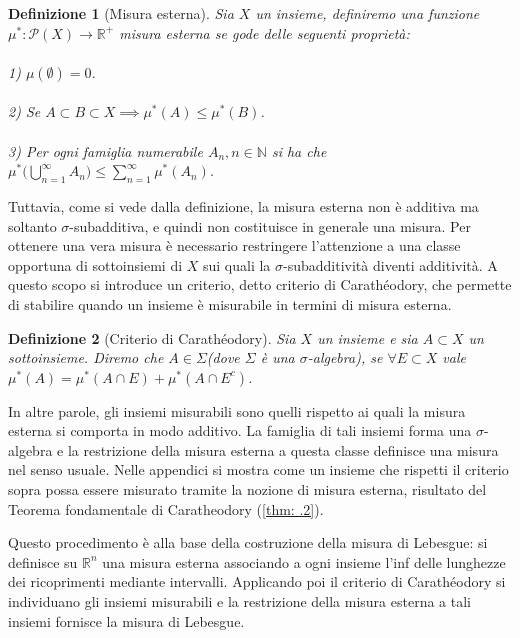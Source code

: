 \documentclass[a4paper,12pt]{report}
\newtheorem{definizione}{Definizione}[chapter]
\begin{document}
\begin{definizione}[Misura esterna]\label{def: 3.4}
    Sia $X$ un insieme, definiremo una funzione 
    \\$\mu^*:\mathscr{P}(X) \to \mathbb{R}^+$ misura esterna se gode delle seguenti proprietà:
    \\
    \\ 1) $\mu(\emptyset)=0$.
    \\
    \\ 2) Se $A\subset B \subset X \implies \mu^*(A)\leq \mu^*(B)$.
    \\
    \\ 3) Per ogni famiglia numerabile $A_n, n\in \mathbb{N}$ si ha che $\mu^*\bigg(\displaystyle\bigcup_{n=1}^\infty A_n\bigg)\leq\sum_{n=1}^\infty \mu^*(A_n).$
\end{definizione}

Tuttavia, come si vede dalla definizione, la misura esterna non è additiva ma soltanto $\sigma$-subadditiva, e quindi non costituisce in generale una misura. Per ottenere una vera misura è necessario restringere l’attenzione a una classe opportuna di sottoinsiemi di $X$ sui quali la $\sigma$-subadditività diventi additività. A questo scopo si introduce un criterio, detto criterio di Carathéodory, che permette di stabilire quando un insieme è misurabile in termini di misura esterna.

\begin{definizione}[Criterio di Carathéodory]\label{def: 3.5}
    Sia $X$ un insieme e sia $A \subset X$ un sottoinsieme. Diremo che $A \in \Sigma$(dove $\Sigma$ è una $\sigma$-algebra), se $\forall E \subset X$ vale \mbox{$\mu^*(A)=\mu^*(A\cap E)+\mu^*(A\cap E^c)$}.
\end{definizione}

\newpage

In altre parole, gli insiemi misurabili sono quelli rispetto ai quali la misura esterna si comporta in modo additivo. La famiglia di tali insiemi forma una $\sigma$-algebra e la restrizione della misura esterna a questa classe definisce una misura nel senso usuale. Nelle appendici si mostra come un insieme che rispetti il criterio sopra possa essere misurato tramite la nozione di misura esterna, risultato del Teorema fondamentale di Caratheodory (\ref{thm: .2}).

Questo procedimento è alla base della costruzione della misura di Lebesgue: si definisce su $\mathbb{R}^n$ una misura esterna associando a ogni insieme l’inf delle lunghezze dei ricoprimenti mediante intervalli. Applicando poi il criterio di Carathéodory si individuano gli insiemi misurabili e la restrizione della misura esterna a tali insiemi fornisce la misura di Lebesgue.
\end{document}
